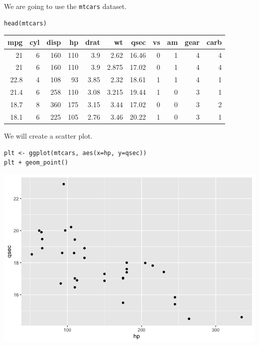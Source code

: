 \documentclass[11pt]{article}
\begin{document}
We are going to use the \texttt{mtcars} dataset.

\begin{verbatim}
head(mtcars)
\end{verbatim}

\begin{org}
\begin{center}
\begin{tabular}{rrrrrrrrrrr}
mpg & cyl & disp & hp & drat & wt & qsec & vs & am & gear & carb\\
\hline
21 & 6 & 160 & 110 & 3.9 & 2.62 & 16.46 & 0 & 1 & 4 & 4\\
21 & 6 & 160 & 110 & 3.9 & 2.875 & 17.02 & 0 & 1 & 4 & 4\\
22.8 & 4 & 108 & 93 & 3.85 & 2.32 & 18.61 & 1 & 1 & 4 & 1\\
21.4 & 6 & 258 & 110 & 3.08 & 3.215 & 19.44 & 1 & 0 & 3 & 1\\
18.7 & 8 & 360 & 175 & 3.15 & 3.44 & 17.02 & 0 & 0 & 3 & 2\\
18.1 & 6 & 225 & 105 & 2.76 & 3.46 & 20.22 & 1 & 0 & 3 & 1\\
\end{tabular}
\end{center}
\end{org}

We will create a scatter plot.

\begin{verbatim}
plt <- ggplot(mtcars, aes(x=hp, y=qsec))
plt + geom_point()
\end{verbatim}

\begin{org}
\begin{center}
\includegraphics[width=.9\linewidth]{./resources/mtcars_cor1.png}
\end{center}
\end{org}
\end{document}
